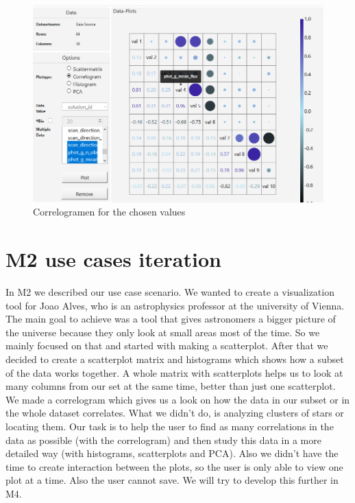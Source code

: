 \documentclass{article}
\begin{document}
\begin{figure}[!h]
\centering
\includegraphics[width=1\textwidth]{images/m3/corr3.PNG}
\caption{Correlogramen for the chosen values}
\end{figure}
\newpage

\section{M2 use cases iteration}
In M2 we described our use case scenario. We wanted to create a visualization tool for Joao Alves, who is an astrophysics professor at the university of Vienna. The main goal to achieve was a tool that gives astronomers a bigger picture of the universe because they only look at small areas most of the time. So we mainly focused on that and started with making a scatterplot. After that we decided to create a scatterplot matrix and histograms which shows how a subset of the data works together. A whole matrix with scatterplots helps us to look at many columns from our set at the same time, better than just one scatterplot. We made a correlogram which gives us a look on how the data in our subset or in the whole dataset correlates. What we didn't do, is analyzing clusters of stars or locating them. Our task is to help the user to find as many correlations in the data as possible (with the correlogram) and then study this data in a more detailed way (with histograms, scatterplots and PCA). Also we didn't have the time to create interaction between the plots, so the user is only able to view one plot at a time. Also the user cannot save. We will try to develop this further in M4.
\end{document}
